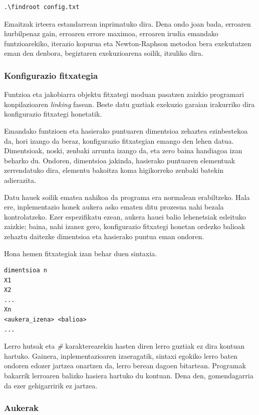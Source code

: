 \documentclass[10pt,a4paper,basque]{article}
\begin{document}
\begin{lstlisting}
.\findroot config.txt
\end{lstlisting}

Emaitzak irteera estandarrean inprimatuko dira. Dena ondo joan bada, erroaren hurbilpenaz gain, erroaren errore maximoa, erroaren irudia emandako funtzioarekiko, iterazio kopurua eta Newton-Raphson metodoa bera exekutatzen eman den denbora, begiztaren exekuzioarena soilik, itzuliko dira.

\subsubsection{Konfigurazio fitxategia}

Funtzioa eta jakobiarra objektu fitxategi moduan pasatzen zaizkio programari konpilazioaren \emph{linking} fasean. Beste datu guztiak exekuzio garaian irakurriko dira konfigurazio fitxategi honetatik.

Emandako funtzioen eta hasierako puntuaren dimentsioa zehaztea ezinbestekoa da, hori izango da beraz, konfigurazio fitxategian emango den lehen datua. Dimentsioak, noski, zenbaki arrunta izango da, eta zero baina handiagoa izan beharko du. Ondoren, dimentsioa jakinda, hasierako puntuaren elementuak zerrendatuko dira, elementu bakoitza koma higikorreko zenbaki batekin adierazita.

Datu hauek soilik ematea nahikoa da programa era normalean erabiltzeko. Hala ere, inplementazio honek aukera asko ematen ditu prozesua nahi bezala kontrolatzeko. Ezer espezifikatu ezean, aukera hauei balio lehenetsiak esleituko zaizkie; baina, nahi izanez gero, konfigurazio fitxategi honetan ordezko balioak zehaztu daitezke dimentsioa eta hasierako puntua eman ondoren.

Hona hemen fitxategiak izan behar duen sintaxia.

\begin{lstlisting}
dimentsioa n
X1
X2
...
Xn
<aukera_izena> <balioa>
...
\end{lstlisting}

Lerro hutsak eta \emph{\#} karakterearekin hasten diren lerro guztiak ez dira kontuan hartuko. Gainera, inplementazioaren izaeragatik, sintaxi egokiko lerro baten ondoren edozer jartzea onartzen da, lerro berean dagoen bitartean. Programak bakarrik lerroaren balizko hasiera hartuko du kontuan. Dena den, gomendagarria da ezer gehigarririk ez jartzea.

\subsubsection{Aukerak}
\end{document}
